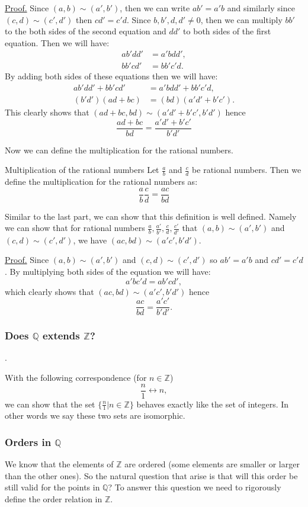 \underline{Proof.} Since $ (a,b) \sim (a',b') $, then we can write $ ab' = a'b $ and similarly since $ (c,d) \sim (c',d') $ then $ cd' = c'd $. Since $ b,b',d,d' \neq 0 $, then we can multiply $ bb' $ to the both sides of the second equation and $ dd' $ to both sides of the first equation. Then we will have:
\begin{align*}
	ab'dd' &= a'bdd', \\
	bb'cd' &= bb'c'd.
\end{align*}
By adding both sides of these equations then we will have: 
\begin{align*}
	ab'dd' + bb'cd' &= a'bdd' + bb'c'd, \\
	(b'd')(ad+bc) &= (bd)(a'd' + b'c').
\end{align*}
This clearly shows that $ (ad+bc, bd) \sim (a'd'+b'c', b'd') $ hence \[\frac{ad+bc}{bd} = \frac{a'd' + b'c'}{b'd'} \]


Now we can define the multiplication for the rational numbers.
\begin{defbox}{Multiplication of the rational numbers}
	Let $ \frac{a}{b} $ and $ \frac{c}{d} $ be rational numbers. Then we define the multiplication for the rational numbers as:
	\[ \frac{a}{b} \frac{c}{d} = \frac{ac}{bd} \]
\end{defbox}

Similar to the last part, we can show that this definition is well defined. Namely we can show that for rational numbers $ \frac{a}{b},\frac{a'}{b'},\frac{c}{d},\frac{c'}{d'} $ that $ (a,b) \sim (a',b') $ and $ (c,d) \sim (c',d') $, we have $ (ac,bd) \sim (a'c', b'd') $.

\underline{Proof.} Since $ (a,b) \sim (a',b') $ and $ (c,d) \sim (c',d') $ so $ ab' = a'b $ and $ cd' = c'd $. By multiplying both sides of the equation we will have:
\[ a'bc'd = ab'cd', \] 
which clearly shows that  $ (ac,bd) \sim (a'c', b'd') $ hence
\[ \frac{ac}{bd} =  \frac{a'c'}{b'd'}. \]


\subsubsection{Does $ \mathbb{Q} $ extends $ \mathbb{Z} $?}.

With the following correspondence (for $ n \in \mathbb{Z} $)
\[ \frac{n}{1} \leftrightarrow n, \]
we can show that the set $ \{ \frac{n}{1} | n\in \mathbb{Z} \} $ behaves exactly like the set of integers. In other words we say these two sets are isomorphic.

\subsubsection{Orders in $ \mathbb{Q} $}
We know that the elements of $ \mathbb{Z} $ are ordered (some elements are smaller or larger than the other ones). So the natural question that arise is that will this order be still valid for the points in $ \mathbb{Q} $? To answer this question we need to rigorously define the order relation in $ \mathbb{Z} $.

